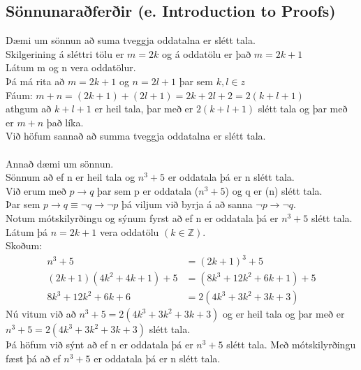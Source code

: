 \subsection{Sönnunaraðferðir  (e. Introduction to Proofs)}
Dæmi um sönnun að suma tveggja oddatalna er slétt tala.\\
Skilgerining á sléttri tölu er $m = 2k$ og á oddatölu er það $m = 2k+1$\\
Látum m og n vera oddatölur.\\
Þá má rita að $m = 2k+1$ og $n = 2l+1$ þar sem $k,l \in z$\\
Fáum: $m+n = (2k+1) + (2l+1) = 2k + 2l + 2 = 2(k+l+1)$\\
athgum að $k+l+1$ er heil tala, þar með er $2(k+l+1)$ slétt tala og þar með er $m+n$ það líka.\\
Við höfum sannað að summa tveggja oddatalna er slétt tala.\\
\\
Annað dæmi um sönnun.\\
Sönnum að ef n er heil tala og $n^3 + 5$ er oddatala þá er n slétt tala.\\
Við erum með $p \to q$ þar sem p er oddatala ($n^3 + 5$) og q er (n) slétt tala.\\ 
Þar sem $p \to q \equiv \lnot q \to \lnot p$ þá viljum við byrja á að sanna $\lnot p \to \lnot q$.\\
Notum mótskilyrðingu og sýnum fyrst að ef n er oddatala þá er $n^3 + 5$ slétt tala.\\
Látum þá $n = 2k+1$ vera oddatölu $(k \in \mathbb{Z})$.\\
Skoðum: 
\begin{align} 
    n^3 + 5 &= (2k+1)^3 + 5 \\
    (2k+1)(4k^2 + 4k + 1) + 5 &= (8k^3 + 12k^2 + 6k + 1) + 5 \\ 
    8k^3 + 12k^2 + 6k + 6 &= 2(4k^3 + 3k^2 + 3k + 3) 
\end{align}
Nú vitum við að $n^3+5 = 2(4k^3 + 3k^2 + 3k + 3)$ og er heil tala og þar með er $n^3+5 = 2(4k^3 + 3k^2 + 3k + 3)$ slétt tala.\\
Þá höfum við sýnt að ef n er oddatala þá er $n^3+5$ slétt tala. Með mótskilyrðingu fæst þá að ef $n^3+5$ er oddatala þá er n slétt tala.
\newpage